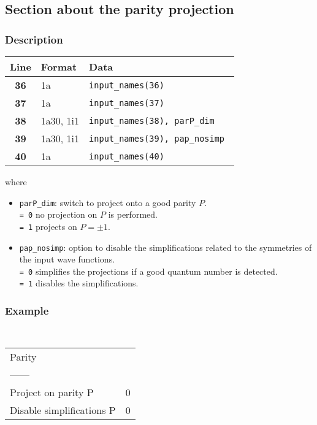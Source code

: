 \documentclass[a4paper,11pt]{article}
\newcommand{\ttt}[1]{\texttt{#1}}
\begin{document}
%
%
\subsection{Section about the parity projection}

\subsubsection*{Description}
\begin{center}
\begin{tabular}{|c|l|l|}
\hline
Line & Format & Data \\
\hline
 \textbf{36}   & 1a        & \tt input\_names(36)              \\
 \textbf{37}   & 1a        & \tt input\_names(37)              \\
 \textbf{38}   & 1a30, 1i1 & \tt input\_names(38), parP\_dim   \\
 \textbf{39}   & 1a30, 1i1 & \tt input\_names(39), pap\_nosimp \\
 \textbf{40}   & 1a        & \tt input\_names(40)              \\
\hline
\end{tabular}
\end{center}
where
\begin{itemize}
 \item \ttt{parP\_dim}: switch to project onto a good parity $P$. \\[0.05cm]
  \ttt{= 0\:} no projection on $P$ is performed. \\[0.05cm]
  \ttt{= 1\:} projects on $P= \pm 1$.
 \item \ttt{pap\_nosimp}: option to disable the simplifications related to the symmetries of the input wave functions. \\[0.05cm]
  \ttt{= 0\:} simplifies the projections if a good quantum number is detected. \\[0.05cm]
  \ttt{= 1\:} disables the simplifications.
\end{itemize}

\subsubsection*{Example}
\begin{center}
\tt
\begin{tabular}{|ll|}
\hline
Parity                        &      \\
------                        &      \\
Project on parity P           &0     \\
Disable simplifications  P    &0     \\
\hline
\end{tabular}
\end{center}
\end{document}
